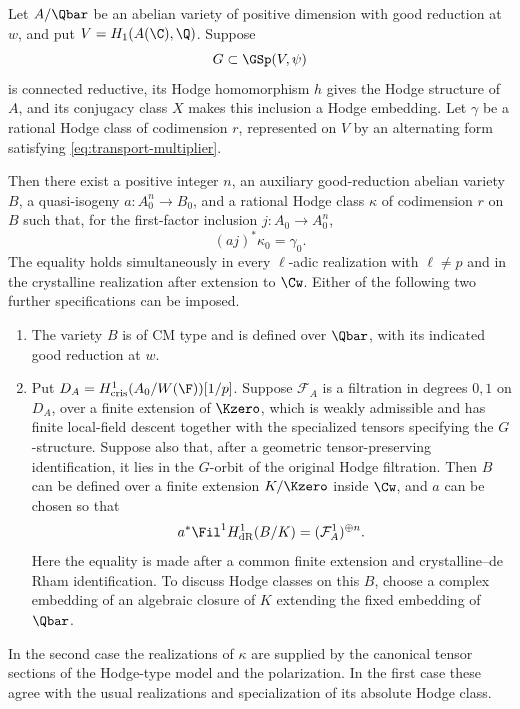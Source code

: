 \begin{proposition}[Transport]
\label{prop:transport}
Let $A/\Qbar$ be an abelian variety of positive dimension with good
reduction at $w$, and put $V=H_1(A(\C),\Q)$. Suppose
\[
 G\subset\GSp(V,\psi)
\]
is connected reductive, its Hodge homomorphism $h$ gives the
Hodge structure of $A$, and its conjugacy class $X$ makes this
inclusion a Hodge embedding. Let $\gamma$ be a rational Hodge
class of codimension $r$, represented on $V$ by an alternating
form satisfying \eqref{eq:transport-multiplier}.

Then there exist a positive integer $n$, an auxiliary
good-reduction abelian variety $B$, a quasi-isogeny
$a:A_0^n\to B_0$, and a rational Hodge class $\kappa$ of
codimension $r$ on $B$ such that, for the first-factor inclusion
$j:A_0\to A_0^n$,
\begin{equation}
 (aj)^*\kappa_0=\gamma_0.
 \label{eq:transport-class}
\end{equation}
The equality holds simultaneously in every $\ell$-adic
realization with $\ell\ne p$ and in the crystalline realization
after extension to $\Cw$. Either of the following two further
specifications can be imposed.
\begin{enumerate}
\item The variety $B$ is of CM type and is defined over $\Qbar$,
with its indicated good reduction at $w$.
\item Put $D_A=H^1_{\mathrm{cris}}(A_0/W(\F))[1/p]$. Suppose
$\mathcal F_A$ is a filtration in degrees $0,1$ on $D_A$, over a
finite extension of $\Kzero$, which is weakly admissible and has
finite local-field descent together with the specialized tensors
specifying the $G$-structure. Suppose
also that, after a geometric tensor-preserving identification, it
lies in the $G$-orbit of the original Hodge filtration. Then $B$
can be defined over a finite extension $K/\Kzero$ inside $\Cw$,
and $a$ can be chosen so that
\begin{equation}
 a^*\Fil^1H^1_{\mathrm{dR}}(B/K)
       =(\mathcal F_A^1)^{\oplus n}.
 \label{eq:transport-prescribed-filtration}
\end{equation}
Here the equality is made after a common finite extension and
crystalline--de Rham identification. To discuss Hodge classes on
this $B$, choose a complex embedding of an algebraic closure of
$K$ extending the fixed embedding of $\Qbar$.
\end{enumerate}
In the second case the realizations of $\kappa$ are supplied by
the canonical tensor sections of the Hodge-type model and the
polarization. In the first case these agree with the usual
realizations and specialization of its absolute Hodge class.
\end{proposition}

